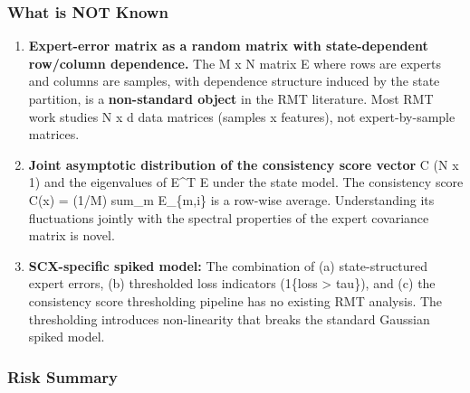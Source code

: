 \documentclass[
  12pt,
]{article}
\begin{document}
\subsubsection{What is NOT Known}\label{what-is-not-known}

\begin{enumerate}
\def\labelenumi{\arabic{enumi}.}
\item
  \textbf{Expert-error matrix as a random matrix with state-dependent
  row/column dependence.} The M x N matrix E where rows are experts and
  columns are samples, with dependence structure induced by the state
  partition, is a \textbf{non-standard object} in the RMT literature.
  Most RMT work studies N x d data matrices (samples x features), not
  expert-by-sample matrices.
\item
  \textbf{Joint asymptotic distribution of the consistency score vector}
  C (N x 1) and the eigenvalues of E\^{}T E under the state model. The
  consistency score C(x) = (1/M) sum\_m E\_\{m,i\} is a row-wise
  average. Understanding its fluctuations jointly with the spectral
  properties of the expert covariance matrix is novel.
\item
  \textbf{SCX-specific spiked model:} The combination of (a)
  state-structured expert errors, (b) thresholded loss indicators
  (1\{loss \textgreater{} tau\}), and (c) the consistency score
  thresholding pipeline has no existing RMT analysis. The thresholding
  introduces non-linearity that breaks the standard Gaussian spiked
  model.
\end{enumerate}

\subsubsection{Risk Summary}\label{risk-summary}
\end{document}
